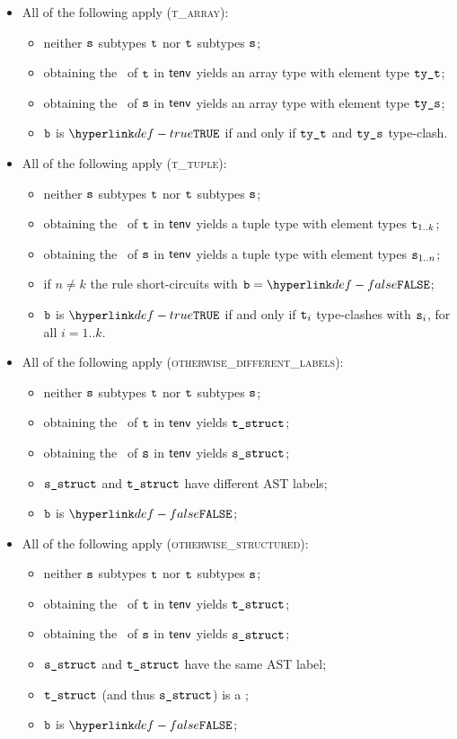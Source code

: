 \begin{itemize}
  \item All of the following apply (\textsc{t\_array}):
  \begin{itemize}
    \item neither $\texttt{s}$ subtypes $\texttt{t}$ nor $\texttt{t}$ subtypes $\texttt{s}$;
    \item obtaining the \structure\ of $\texttt{t}$ in $\textsf{tenv}$ yields an array type with element type $\texttt{ty\_t}$;
    \item obtaining the \structure\ of $\texttt{s}$ in $\textsf{tenv}$ yields an array type with element type $\texttt{ty\_s}$;
    \item $\texttt{b}$ is $\True$ if and only if $\texttt{ty\_t}$ and $\texttt{ty\_s}$ type-clash.
  \end{itemize}

  \item All of the following apply (\textsc{t\_tuple}):
  \begin{itemize}
    \item neither $\texttt{s}$ subtypes $\texttt{t}$ nor $\texttt{t}$ subtypes $\texttt{s}$;
    \item obtaining the \structure\ of $\texttt{t}$ in $\textsf{tenv}$ yields a tuple type with element types $\texttt{t}_{1..k}$;
    \item obtaining the \structure\ of $\texttt{s}$ in $\textsf{tenv}$ yields a tuple type with element types $\texttt{s}_{1..n}$;
    \item if $n \neq k$ the rule short-circuits with $\vb=\False$;
    \item $\texttt{b}$ is $\True$ if and only if $\texttt{t}_i$ type-clashes with $\texttt{s}_i$, for all $i=1..k$.
  \end{itemize}

  \item All of the following apply (\textsc{otherwise\_different\_labels}):
  \begin{itemize}
    \item neither $\texttt{s}$ subtypes $\texttt{t}$ nor $\texttt{t}$ subtypes $\texttt{s}$;
    \item obtaining the \structure\ of $\texttt{t}$ in $\textsf{tenv}$ yields $\texttt{t\_struct}$;
    \item obtaining the \structure\ of $\texttt{s}$ in $\textsf{tenv}$ yields $\texttt{s\_struct}$;
    \item $\texttt{s\_struct}$ and $\texttt{t\_struct}$ have different AST labels;
    \item $\texttt{b}$ is $\False$;
  \end{itemize}

  \item All of the following apply (\textsc{otherwise\_structured}):
  \begin{itemize}
    \item neither $\texttt{s}$ subtypes $\texttt{t}$ nor $\texttt{t}$ subtypes $\texttt{s}$;
    \item obtaining the \structure\ of $\texttt{t}$ in $\textsf{tenv}$ yields $\texttt{t\_struct}$;
    \item obtaining the \structure\ of $\texttt{s}$ in $\textsf{tenv}$ yields $\texttt{s\_struct}$;
    \item $\texttt{s\_struct}$ and $\texttt{t\_struct}$ have the same AST label;
    \item $\texttt{t\_struct}$ (and thus $\texttt{s\_struct}$) is a \structuredtype;
    \item $\texttt{b}$ is $\False$;
  \end{itemize}
\end{itemize}
